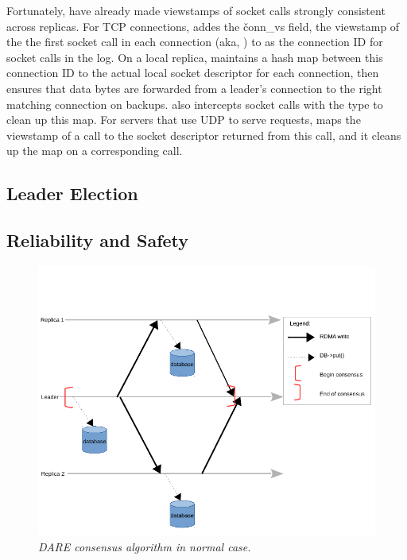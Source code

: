 Fortunately, \paxos have already made viewstamps of socket calls strongly 
consistent across replicas. For TCP connections, \xxx addes the 
\v{conn\_vs} field, the viewstamp of the the first socket call in each 
connection (aka, \accept) to as the connection ID for socket calls in the 
log. On a local replica, \xxx maintains a hash map between this connection ID 
to the actual local socket descriptor for each connection, then \xxx ensures 
that data bytes are forwarded from a leader's connection to the right matching 
connection on backups. \xxx also intercepts socket calls with the \close type 
to clean up this map. For servers that use UDP to serve requests, \xxx maps the 
viewstamp of a \recvfrom call to the socket descriptor returned from this call, 
and it cleans up the map on a corresponding \sendto call. 






\subsection{Leader Election} \label{sec:election}



\subsection{Reliability and Safety} \label{sec:guarantees}

\begin{figure}[t]
\centering
\vspace{-.20in}
\includegraphics[width=.48\textwidth]{figures/dare}
\vspace{-.20in}
\caption{{\em DARE consensus algorithm in normal case.}} \label{fig:dare}
\vspace{-.05in}
\end{figure}

